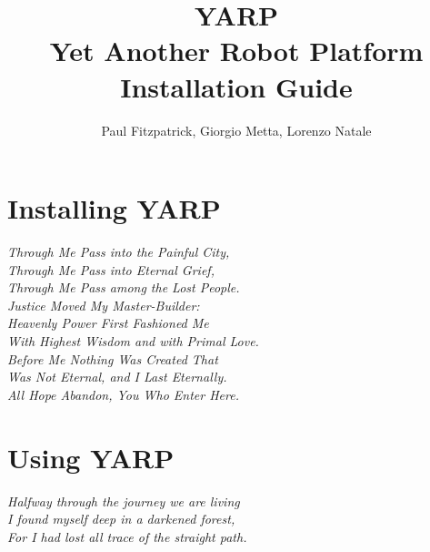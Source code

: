\documentclass[a4paper]{report}
\begin{document}
\title{{\LARGE YARP}\\Yet Another Robot Platform\\
Installation Guide
}

\author{Paul Fitzpatrick, Giorgio Metta, Lorenzo Natale}

\addtolength{\hoffset}{1cm}
\maketitle
\thispagestyle{empty}
\newpage

\tableofcontents

\newpage
\chapter{Installing YARP}
\begin{flushright}
\textit{
          Through Me Pass into the Painful City, \\
          Through Me Pass into Eternal Grief, \\
          Through Me Pass among the Lost People. \\ 
          Justice Moved My Master-Builder: \\
          Heavenly Power First Fashioned Me \\
          With Highest Wisdom and with Primal Love. \\
          Before Me Nothing Was Created That  \\
          Was Not Eternal, and I Last Eternally. \\ 
          All Hope Abandon, You Who Enter Here. \\
        }
\end{flushright}

\newpage
\addtolength{\hoffset}{-1cm}




\newpage
\chapter{Using YARP}
\label {chapter:usage}
\begin{flushright}
\textit{
					Halfway through the journey we are living \\
          I found myself deep in a darkened forest, \\
          For I had lost all trace of the straight path. \\
       }
\end{flushright}
\addtolength{\hoffset}{1cm}
\end{document}
